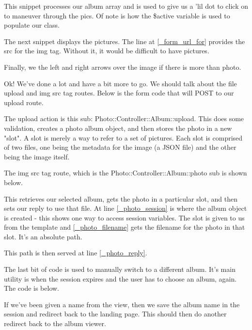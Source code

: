 \documentclass[14pt]{extreport}
\newcommand\Small{\fontsize{10}{10.2}\selectfont}
\newcommand*\LSTfont{\Small\ttfamily\SetTracking{encoding=*}{-60}\lsstyle}
\begin{document}


This snippet processes our album array and is used to give us a 'lil dot to click on
to maneuver through the pics.  Of note is how the \$active variable is used to populate
our class.



The next snippet displays the pictures. The line at \ref{_form_url_for} provides the 
src for the img tag. Without it, it would be difficult to have pictures.



Finally, we the left and right arrows over the image if there is more than photo.

Ok!  We've done a lot and have a bit more to go.  We should talk about the file upload
and img src tag routes.  Below is the form code that will POST to our upload route.



The upload action is this sub: Photo::Controller::Album::upload.  This does
some validation, creates a photo album object, and then stores the photo in a
new "slot".  A slot is merely a way to refer to a set of pictures.  Each slot
is comprised of two files, one being the metadata for the image (a JSON file)
and the other being the image itself.

The img src tag route, which is the Photo::Controller::Album::photo sub is shown below.



This retrieves our selected album, gets the photo in a particular slot, and
then sets our reply to use that file. At line \ref{_photo_session} is where the
album object is created - this shows one way to access session variables. The slot
is given to us from the template and \ref{_photo_filename} gets the filename
for the photo in that slot.  It's an absolute path.

This path is then served at line \ref{_photo_reply}.

The last bit of code is used to manually switch to a different album. It's main utility
is when the session expires and the user has to choose an album, again.  The code is
below.



If we've been given a name from the view, then we save the album name in the session and
redirect back to the landing page.  This should then do another redirect back to the
album viewer.
\end{document}
